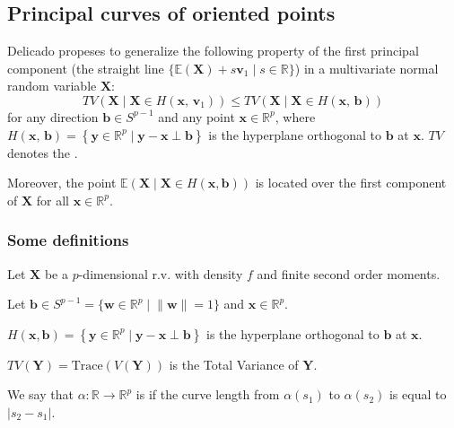 \subsection{Principal curves of oriented points}

Delicado \cite{delicado_another_2001} propeses to generalize the following property of the
first principal component (the straight line
$\{\mathds{E}(\boldsymbol X) + s \boldsymbol v_1 \mid s \in \mathds{R}\}$)
in a multivariate normal random variable $\boldsymbol X$:
\begin{equation*}
	TV(\boldsymbol X \mid \boldsymbol X \in H(\boldsymbol x,\, \boldsymbol v_1))
	\leq
	TV(\boldsymbol X \mid \boldsymbol X \in H(\boldsymbol x,\, \boldsymbol b))
\end{equation*}
for any direction $\boldsymbol b \in S^{p-1}$ and any point $\boldsymbol x \in \mathds{R}^p$,
where $H(\boldsymbol x,\, \boldsymbol b) = \left\{
	\boldsymbol y \in \mathds{R}^p \mid \boldsymbol y - \boldsymbol x \perp \boldsymbol b
	\right\}$
is the hyperplane orthogonal to $\boldsymbol b$ at $\boldsymbol x$.
$TV$ denotes the .

Moreover, the point $\mathds{E}(\boldsymbol X \mid \boldsymbol X \in H(\boldsymbol x, \boldsymbol b))$
is located over the first component of $\boldsymbol X$ for all $\boldsymbol x \in \mathds{R}^p$.

\subsubsection{Some definitions}

Let $\boldsymbol X$ be a $p$-dimensional r.v. with density $f$ and finite
second order moments.

Let $\boldsymbol b \in S^{p-1} = \{\boldsymbol w \in \mathds{R}^p \mid
	\lVert \boldsymbol w \rVert = 1\}$ and $\boldsymbol x \in \mathds{R}^p$.

$H(\boldsymbol x, \boldsymbol b) = \left\{
	\boldsymbol y \in \mathds{R}^p \mid \boldsymbol y - \boldsymbol x \perp \boldsymbol b
	\right\}$ is the hyperplane orthogonal to $\boldsymbol b$ at $\boldsymbol x$.

$TV(\boldsymbol Y) = \text{Trace}(V(\boldsymbol Y))$ is the Total Variance of $\boldsymbol Y$.

We say that $\alpha : \mathds{R} \to \mathds{R}^p$ is 
if the curve length from $\alpha(s_1)$ to $\alpha(s_2)$ is equal to $|s_2 - s_1|$.

